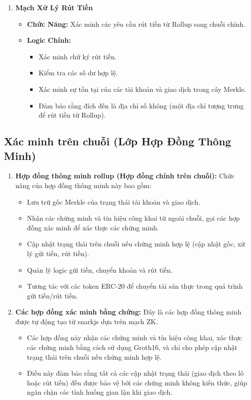 \begin{enumerate}
\item \textbf{Mạch Xử Lý Rút Tiền}
\begin{itemize}
    \item \textbf{Chức Năng:} Xác minh các yêu cầu rút tiền từ Rollup sang chuỗi chính.
    \item \textbf{Logic Chính:}
    \begin{itemize}
        \item Xác minh chữ ký rút tiền.
        \item Kiểm tra các số dư hợp lệ.
        \item Xác minh sự tồn tại của các tài khoản và giao dịch trong cây Merkle.
        \item Đảm bảo rằng đích đến là địa chỉ số không (một địa chỉ tượng trưng để rút tiền từ Rollup).
    \end{itemize}
\end{itemize}
\end{enumerate}
\subsection{Xác minh trên chuỗi (Lớp Hợp Đồng Thông Minh)}
\begin{enumerate}
    \item \textbf{Hợp đồng thông minh rollup (Hợp đồng chính trên chuỗi):}
    Chức năng của hợp đồng thông minh này bao gồm:
    \begin{itemize}
        \item Lưu trữ gốc Merkle của trạng thái tài khoản và giao dịch.
        \item Nhận các chứng minh và tín hiệu công khai từ ngoài chuỗi, gọi các hợp đồng xác minh để xác thực các chứng minh.
        \item Cập nhật trạng thái trên chuỗi nếu chứng minh hợp lệ (cập nhật gốc, xử lý gửi tiền, rút tiền).
        \item Quản lý logic gửi tiền, chuyển khoản và rút tiền.
        \item Tương tác với các token ERC-20 để chuyển tài sản thực trong quá trình gửi tiền/rút tiền.
    \end{itemize}
    \item \textbf{Các hợp đồng xác minh bằng chứng:} 
    Đây là các hợp đồng thông minh được tự động tạo từ snarkjs dựa trên mạch ZK.
    \begin{itemize}
        \item Các hợp đồng này nhận các chứng minh và tín hiệu công khai, xác thực các chứng minh bằng cách sử dụng Groth16, và chỉ cho phép cập nhật trạng thái trên chuỗi nếu chứng minh hợp lệ.
        \item Điều này đảm bảo rằng tất cả các cập nhật trạng thái (giao dịch theo lô hoặc rút tiền) đều được bảo vệ bởi các chứng minh không kiến thức, giúp ngăn chặn các tính huống gian lận khi giao dịch.
    \end{itemize}
\end{enumerate}

